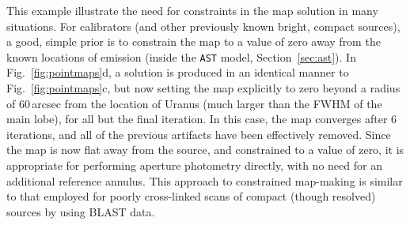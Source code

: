 \documentclass[useAMS,usenatbib,nofootinbib]{mn2e}
\newcommand{\model}[1]{\texttt{#1}}
\begin{document}
This example illustrate the need for constraints in the map solution
in many situations. For calibrators (and other previously known
bright, compact sources), a good, simple prior is to constrain the map
to a value of zero away from the known locations of emission (inside
the \model{AST} model, Section~\ref{sec:ast}). In
Fig.~\ref{fig:pointmaps}d, a solution is produced in an identical
manner to Fig.~\ref{fig:pointmaps}c, but now setting the map
explicitly to zero beyond a radius of 60\,arcsec from the location of
Uranus (much larger than the FWHM of the main lobe), for all but the
final iteration. In this case, the map converges after 6 iterations,
and all of the previous artifacts have been effectively removed. Since
the map is now flat away from the source, and constrained to a value
of zero, it is appropriate for performing aperture photometry
directly, with no need for an additional reference annulus. This
approach to constrained map-making is similar to that employed for
poorly cross-linked scans of compact (though resolved) sources by
\citet{wiebe2009} using BLAST data.
\end{document}

